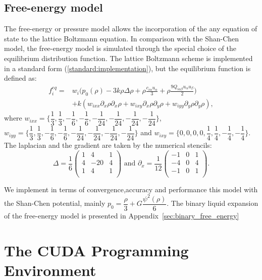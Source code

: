 \documentclass[mathpazo]{cicp}
\begin{document}
\subsection{Free-energy model}
The free-energy or pressure model \cite{swift} allows the incorporation of the any equation of state to the lattice Boltzmann equation. In comparison with the Shan-Chen model, the free-energy model is simulated through the special choice of the equilibrium distribution function. The lattice Boltzmann scheme is implemented in a standard form (\ref{standard:implementation}), but the equilibrium function is defined as:
\begin{equation}
\begin{aligned}
f_i^{eq}=&w_i \biggl(p_0(\rho)-3 k\rho\Delta\rho+\rho \frac{c_{i\alpha}u_{\alpha}}{3}+\rho \frac{9 Q_{i\alpha\beta}u_{\alpha}u_{\beta}}{2}\biggr)\\
&+k (w_{ixx} \partial_x \rho \partial_x \rho + w_{ixy} \partial_x \rho \partial_y \rho + w_{iyy} \partial_y \rho \partial_y \rho),
\end{aligned}
\end{equation}
where $w_{ixx}=\{\dfrac{1}{3},\dfrac{1}{3},-\dfrac{1}{6},-\dfrac{1}{6},-\dfrac{1}{24},-\dfrac{1}{24},-\dfrac{1}{24},-\dfrac{1}{24}\}$, $w_{iyy}=\{\dfrac{1}{3},\dfrac{1}{3},-\dfrac{1}{6},-\dfrac{1}{6},-\dfrac{1}{24},-\dfrac{1}{24},-\dfrac{1}{24},-\dfrac{1}{24}\}$ and $w_{ixy}=\{0,0,0,0,\dfrac{1}{4},\dfrac{1}{4},-\dfrac{1}{4},-\dfrac{1}{4}\}$. The laplacian and the gradient are taken by the numerical stencils:
\begin{equation}
\Delta=\frac{1}{6}
\begin{pmatrix}
1&4&1\\
4&-20&4\\
1&4&1\\
\end{pmatrix}\text{ and }
\partial_x=\frac{1}{12}
\begin{pmatrix}
-1&0&1\\
-4&0&4\\
-1&0&1\\
\end{pmatrix}.
\end{equation}

We implement in terms of convergence,accuracy and performance this model with the Shan-Chen potential, mainly $p_0=\dfrac{\rho}{3}+G\dfrac{\psi^2(\rho)}{6}$. The binary liquid expansion of the free-energy model is presented in Appendix~\ref{sec:binary_free_energy}


\section{The CUDA Programming Environment}
\end{document}
